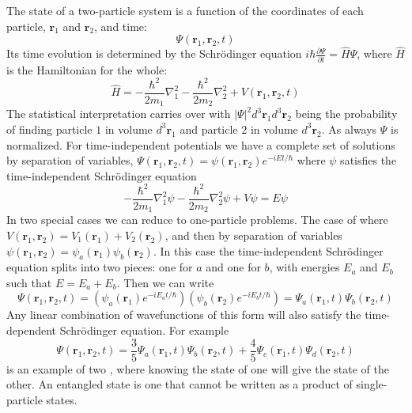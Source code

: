 \documentclass[12pt, a4paper, oneside, openright, titlepage]{book}
\begin{document}
The state of a two-particle system is a function of the coordinates of each particle, $\mathbf{r}_1$ and $\mathbf{r}_2$, and time: \begin{equation*}
    \Psi(\mathbf{r}_1,\mathbf{r}_2,t)
\end{equation*}
Its time evolution is determined by the Schr\"{o}dinger equation $i\hbar\frac{\partial \Psi}{\partial t} = \hat{H}\Psi$, where $\hat{H}$ is the Hamiltonian for the whole: \begin{equation*}
    \hat{H} = -\frac{\hbar^2}{2m_1}\nabla_1^2 - \frac{\hbar^2}{2m_2}\nabla_2^2 + V(\mathbf{r}_1,\mathbf{r}_2,t)
\end{equation*}
The statistical interpretation carries over with $|\Psi|^2d^3\mathbf{r}_1d^3\mathbf{r}_2$ being the probability of finding particle $1$ in volume $d^3\mathbf{r}_1$ and particle $2$ in volume $d^3\mathbf{r}_2$. As always $\Psi$ is normalized. For time-independent potentials we have a complete set of solutions by separation of variables, $\Psi(\mathbf{r}_1,\mathbf{r}_2,t) = \psi(\mathbf{r}_1,\mathbf{r}_2)e^{-iEt/\hbar}$ where $\psi$ satisfies the time-independent Schr\"{o}dinger equation \begin{equation*}
    -\frac{\hbar^2}{2m_1}\nabla_1^2\psi - \frac{\hbar^2}{2m_2}\nabla_2^2\psi + V\psi = E\psi
\end{equation*}
In two special cases we can reduce to one-particle problems. The case of  where $V(\mathbf{r}_1,\mathbf{r}_2) = V_1(\mathbf{r}_1)+V_2(\mathbf{r}_2)$, and then by separation of variables $\psi(\mathbf{r}_1,\mathbf{r}_2) = \psi_a(\mathbf{r}_1)\psi_b(\mathbf{r}_2)$. In this case the time-independent Schr\"{o}dinger equation splits into two pieces: one for $a$ and one for $b$, with energies $E_a$ and $E_b$ such that $E=E_a+E_b$. Then we can write \begin{equation*}
    \Psi(\mathbf{r}_1,\mathbf{r}_2,t) = (\psi_a(\mathbf{r}_1)e^{-iE_at/\hbar})(\psi_b(\mathbf{r}_2)e^{-iE_bt/\hbar}) = \Psi_a(\mathbf{r}_1,t)\Psi_b(\mathbf{r}_2,t)
\end{equation*}
Any linear combination of wavefunctions of this form will also satisfy the time-dependent Schr\"{o}dinger equation. For example \begin{equation*}
    \Psi(\mathbf{r}_1,\mathbf{r}_2,t) = \frac{3}{5}\Psi_a(\mathbf{r}_1,t)\Psi_b(\mathbf{r}_2,t) + \frac{4}{5}\Psi_c(\mathbf{r}_1,t)\Psi_d(\mathbf{r}_2,t)
\end{equation*}
is an example of two , where knowing the state of one will give the state of the other. An entangled state is one that cannot be written as a product of single-particle states.
\end{document}
